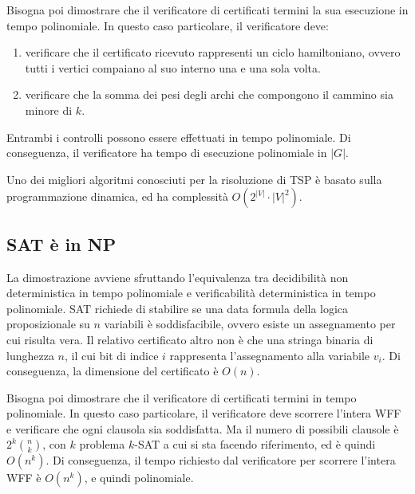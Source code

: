 Bisogna poi dimostrare che il verificatore di certificati termini la sua esecuzione in tempo polinomiale.
In questo caso particolare, il verificatore deve:
\begin{enumerate}
    \item verificare che il certificato ricevuto rappresenti un ciclo hamiltoniano, ovvero tutti i vertici compaiano al suo interno una e una sola volta.
    \item verificare che la somma dei pesi degli archi che compongono il cammino sia minore di $k$.
\end{enumerate}
Entrambi i controlli possono essere effettuati in tempo polinomiale.
Di conseguenza, il verificatore ha tempo di esecuzione polinomiale in $|G|$.

Uno dei migliori algoritmi conosciuti per la risoluzione di TSP è basato sulla programmazione dinamica, ed ha complessità $O(2^{|V|} \cdot |V|^2)$.

\subsection{SAT è in NP}
La dimostrazione avviene sfruttando l'equivalenza tra decidibilità non deterministica in tempo polinomiale e verificabilità deterministica in tempo polinomiale.
SAT richiede di stabilire se una data formula della logica proposizionale su $n$ variabili è soddisfacibile, ovvero esiste un assegnamento per cui risulta vera.
Il relativo certificato altro non è che una stringa binaria di lunghezza $n$, il cui bit di indice $i$ rappresenta l'assegnamento alla variabile $v_i$.
Di conseguenza, la dimensione del certificato è $O(n)$.

Bisogna poi dimostrare che il verificatore di certificati termini in tempo polinomiale. In questo caso particolare, il verificatore deve scorrere l'intera WFF e verificare che ogni clausola sia soddisfatta.
Ma il numero di possibili clausole è $2^k \binom{n}{k}$, con $k$ problema $k$-SAT a cui si sta facendo riferimento, ed è quindi $O(n^k)$.
Di conseguenza, il tempo richiesto dal verificatore per scorrere l'intera WFF è $O(n^k)$, e quindi polinomiale.